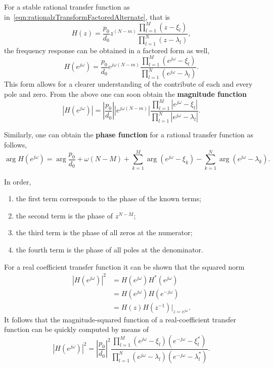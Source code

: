 \documentclass[\documentfontsize, twocolumn]{\classname}
\begin{document}
For a stable rational transfer function as in~\ref{eqn:rationalzTransformFactoredAlternate}, that is
\[
    H(z) = \frac{p_0}{d_0}
    z^{(N-m)}\frac {
        \prod_{l=1}^M\left(z - \xi_l\right)
    } {
        \prod_{l=1}^N\left(z - \lambda_l\right)
    },
\]
the frequency response can be obtained in a factored form as well,
\begin{equation}\label{eqn:frequencyResponseFactoredAlternate}
    H(e^{j\omega}) = \frac{p_0}{d_0}
    e^{j\omega(N-m)}\frac {
        \prod_{l=1}^M\left(e^{j\omega} - \xi_l\right)
    } {
        \prod_{l=1}^N\left(e^{j\omega} - \lambda_l\right)
    }.
\end{equation}
This form allows for a clearer understanding of the contribute of each and every pole and zero. From the above one can soon obtain the \textbf{magnitude function}
\begin{equation}\label{eqn:magnitudeRationalTransferFunction}
    \left|H(e^{j\omega})\right| =
    \left|\frac{p_0}{d_0}\right|\left|e^{j\omega(N-m)}\right|\frac {
        \prod_{l=1}^M\left|e^{j\omega} - \xi_l\right|
    } {
        \prod_{l=1}^N\left|e^{j\omega} - \lambda_l\right|
    }.
\end{equation}

Similarly, one can obtain the \textbf{phase function} for a rational transfer function as follows,
\begin{equation}\label{eqn:phaseRationalTransferFunction}
    \arg{H(e^{j\omega})} = \arg{\frac {p_0}{d_0}} + \omega(N-M) + \sum_{k=1}^M \arg{(e^{j\omega} - \xi_k)} - \sum_{k=1}^N \arg{(e^{j\omega} - \lambda_k)}.
\end{equation}

In order,
\begin{enumerate}
    \item the first term corresponds to the phase of the known terms;
    \item the second term is the phase of $z^{N-M}$;
    \item the third term is the phase of all zeros at the numerator;
    \item the fourth term is the phase of all poles at the denominator.
\end{enumerate}

For a real coefficient transfer function it can be shown that the squared norm
\begin{align*}
    \left|H(e^{j\omega})\right|^2 
    &= H(e^{j\omega}) H^*(e^{j\omega})\\
    &= H(e^{j\omega}) H(e^{-j\omega})\\
    &= H(z) H(z^{-1})\Bigr\rvert_{z=e^{j\omega}}.
\end{align*}
It follows that the magnitude-squared function of a real-coefficient transfer function can be quickly computed by means of
\[
    \left|H(e^{j\omega})\right|^2 = \left|\frac{p_0}{d_0}\right|^2
    \frac {
        \prod_{l=1}^M\left(e^{j\omega} - \xi_l\right)\left(e^{-j\omega} - \xi^*_l\right)
    } {
        \prod_{l=1}^N\left(e^{j\omega} - \lambda_l\right)\left(e^{-j\omega} - \lambda^*_l\right)
    }.
\]
\end{document}
